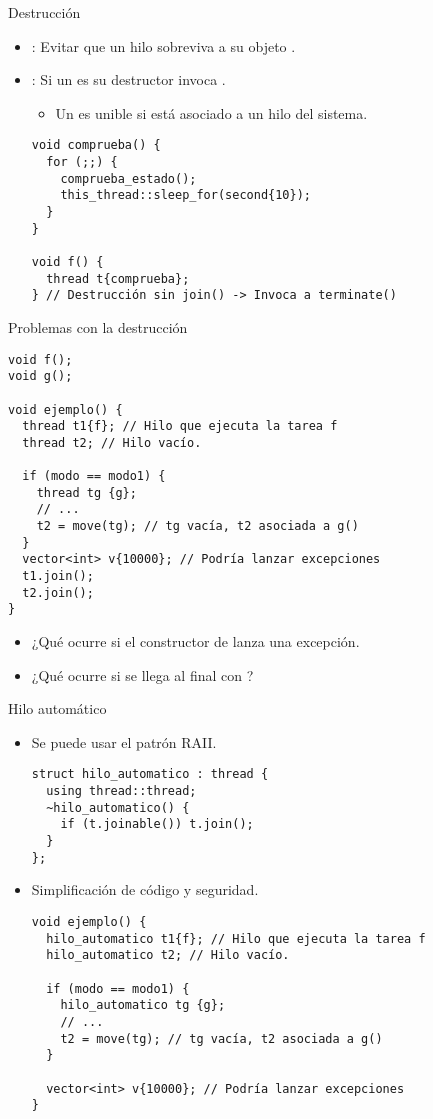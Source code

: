 \begin{frame}[t,fragile]{Destrucción}
\begin{itemize}
  \item {}: Evitar que un hilo sobreviva a su objeto .
  \item {}: Si un  es  su destructor invoca .
    \begin{itemize}
      \item Un  es unible si está asociado a un hilo del sistema.
    \end{itemize}
\begin{lstlisting}
void comprueba() {
  for (;;) {
    comprueba_estado();
    this_thread::sleep_for(second{10});
  }
}

void f() {
  thread t{comprueba};
} // Destrucción sin join() -> Invoca a terminate()
\end{lstlisting}
\end{itemize}
\end{frame}

\begin{frame}[t,fragile]{Problemas con la destrucción}
\begin{lstlisting}
void f();
void g();

void ejemplo() {
  thread t1{f}; // Hilo que ejecuta la tarea f
  thread t2; // Hilo vacío.

  if (modo == modo1) {
    thread tg {g}; 
    // ...
    t2 = move(tg); // tg vacía, t2 asociada a g()
  }
  vector<int> v{10000}; // Podría lanzar excepciones
  t1.join();
  t2.join();
}
\end{lstlisting}
\begin{itemize}
  \item ¿Qué ocurre si el constructor de  lanza una excepción.
  \item ¿Qué ocurre si se llega al final con ?
\end{itemize}
\end{frame}

\begin{frame}[t,fragile]{Hilo automático}
\begin{itemize}
  \item Se puede usar el patrón RAII.
\begin{lstlisting}
struct hilo_automatico : thread {
  using thread::thread;
  ~hilo_automatico() { 
    if (t.joinable()) t.join(); 
  }
};
\end{lstlisting}
  \item Simplificación de código y seguridad.
\begin{lstlisting}[basicstyle=\tiny]
void ejemplo() {
  hilo_automatico t1{f}; // Hilo que ejecuta la tarea f
  hilo_automatico t2; // Hilo vacío.

  if (modo == modo1) {
    hilo_automatico tg {g}; 
    // ...
    t2 = move(tg); // tg vacía, t2 asociada a g()
  }

  vector<int> v{10000}; // Podría lanzar excepciones
}
\end{lstlisting}
\end{itemize}
\end{frame}


